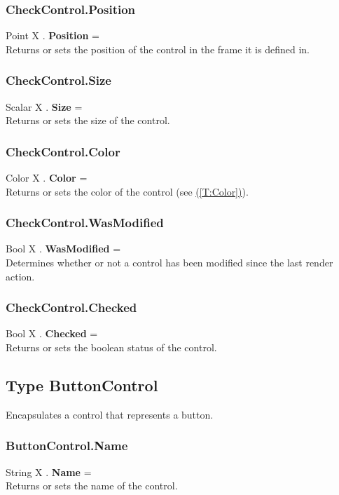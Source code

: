 \documentclass[10pt]{book}
\newcommand{\linkitem}[1]{\hyperref[#1]{\nameref{#1} (\ref{#1})}}
\begin{document}
\subsubsection{CheckControl.Position \label{F:CheckControl:Position}}
Point X . \textbf{Position} = \\
Returns or sets the position of the control in the frame it is defined in.

\subsubsection{CheckControl.Size \label{F:CheckControl:Size}}
Scalar X . \textbf{Size} = \\
Returns or sets the size of the control.

\subsubsection{CheckControl.Color \label{F:CheckControl:Color}}
Color X . \textbf{Color} = \\
Returns or sets the color of the control (see \linkitem{T:Color}).

\subsubsection{CheckControl.WasModified \label{F:CheckControl:WasModified}}
Bool X . \textbf{WasModified} = \\
Determines whether or not a control has been modified since the last render action.

\subsubsection{CheckControl.Checked \label{F:CheckControl:Checked}}
Bool X . \textbf{Checked} = \\
Returns or sets the boolean status of the control.

\subsection{Type ButtonControl \label{T:ButtonControl}}
Encapsulates a control that represents a button.

\subsubsection{ButtonControl.Name \label{F:ButtonControl:Name}}
String X . \textbf{Name} = \\
Returns or sets the name of the control.
\end{document}
